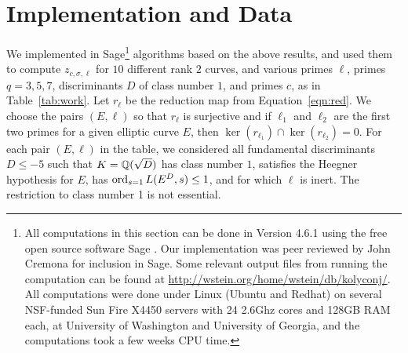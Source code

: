 \documentclass{article} \usepackage[active]{srcltx}
\begin{document}





\section{Implementation and Data}\label{sec:data}
We implemented in Sage\footnote{All computations in this section can
  be done in Version 4.6.1 using the free open source software Sage
  \cite{sage}.  Our implementation was peer reviewed by John Cremona
  for inclusion in Sage.  Some relevant output files from running the
  computation can be found at
  \url{http://wstein.org/home/wstein/db/kolyconj/}.  All computations
  were done under Linux (Ubuntu and Redhat) on several NSF-funded Sun
  Fire X4450 servers with 24 2.6Ghz cores and 128GB RAM each, at
  University of Washington and University of Georgia, and the
  computations took a few weeks CPU time.}  algorithms based on the
above results, and used them to compute $z_{c,\sigma,\ell}$ for $10$
different rank $2$ curves, and various primes $\ell$, primes
$q=3,5,7$, discriminants $D$ of class number $1$, and primes $c$, as
in Table~\ref{tab:work}.  Let $r_{\ell}$ be the reduction map from
Equation~\eqref{eqn:red}. We choose the pairs $(E,\ell)$ so that
$r_{\ell}$ is surjective and if $\ell_1$ and $\ell_2$ are the first
two primes for a given elliptic curve $E$, then $\ker(r_{\ell_1})\cap
\ker(r_{\ell_2})=0$.  For each pair $(E,\ell)$ in the table, we
considered all fundamental discriminants $D\leq -5$ such that
$K=\mathbb{Q}(\sqrt{D})$ has class number $1$, satisfies the Heegner
hypothesis for $E$, has $\operatorname{ord}_{s=1}L(E^D,s) \leq 1$, and for which
$\ell$ is inert.  The restriction to class number 1 is not essential.
\end{document}
